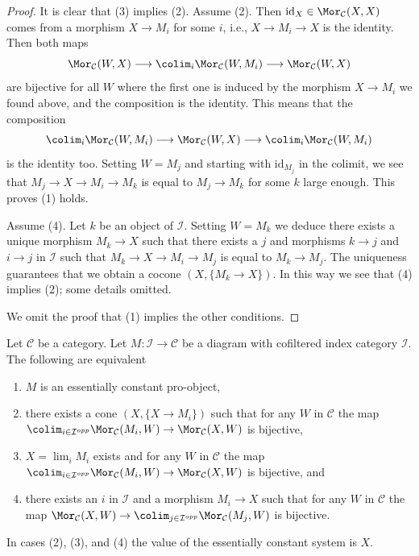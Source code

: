 \begin{proof}
It is clear that (3) implies (2). Assume (2).
Then $\text{id}_X \in \Mor_\mathcal{C}(X, X)$
comes from a morphism $X \to M_i$ for some $i$, i.e., $X \to M_i \to X$
is the identity. Then both maps
$$
\Mor_\mathcal{C}(W, X)
\longrightarrow
\colim_i \Mor_\mathcal{C}(W, M_i)
\longrightarrow
\Mor_\mathcal{C}(W, X)
$$
are bijective for all $W$ where the first one is induced by the morphism
$X \to M_i$ we found above, and the composition is the identity. This means
that the composition
$$
\colim_i \Mor_\mathcal{C}(W, M_i)
\longrightarrow
\Mor_\mathcal{C}(W, X)
\longrightarrow
\colim_i \Mor_\mathcal{C}(W, M_i)
$$
is the identity too. Setting $W = M_j$ and starting with $\text{id}_{M_j}$
in the colimit, we see that $M_j \to X \to M_i \to M_k$ is equal to
$M_j \to M_k$ for some $k$ large enough. This proves (1) holds.

\medskip\noindent
Assume (4). Let $k$ be an object of $\mathcal{I}$. Setting $W = M_k$
we deduce there exists a unique morphism $M_k \to X$ such that
there exists a $j$ and morphisms $k \to j$ and
$i \to j$ in $\mathcal{I}$ such that $M_k \to X \to M_i \to M_j$
is equal to $M_k \to M_j$. The uniqueness guarantees that we obtain a
cocone $(X, \{M_k \to X\})$. In this way we see that (4) implies (2);
some details omitted.

\medskip\noindent
We omit the proof that (1) implies the other conditions.
\end{proof}

\begin{lemma}
\label{lemma-characterize-essentially-constant-pro}
Let $\mathcal{C}$ be a category. Let $M : \mathcal{I} \to \mathcal{C}$
be a diagram with cofiltered index category $\mathcal{I}$.
The following are equivalent
\begin{enumerate}
\item $M$ is an essentially constant pro-object,
\item there exists a cone $(X, \{X \to M_i\})$
such that for any $W$ in $\mathcal{C}$ the map
$\colim_{i \in \mathcal{I}^{opp}} \Mor_\mathcal{C}(M_i, W) \to
\Mor_\mathcal{C}(X, W)$ is bijective,
\item $X = \lim_i M_i$ exists and for any $W$ in $\mathcal{C}$
the map
$\colim_{i \in \mathcal{I}^{opp}} \Mor_\mathcal{C}(M_i, W) \to
\Mor_\mathcal{C}(X, W)$ is bijective, and
\item there exists an $i$ in $\mathcal{I}$ and a morphism $M_i \to X$
such that for any $W$ in $\mathcal{C}$ the map $\Mor_\mathcal{C}(X, W) \to
\colim_{j \in \mathcal{I}^{opp}} \Mor_\mathcal{C}(M_j, W)$ is bijective.
\end{enumerate}
In cases (2), (3), and (4) the value of the essentially constant system is $X$.
\end{lemma}

